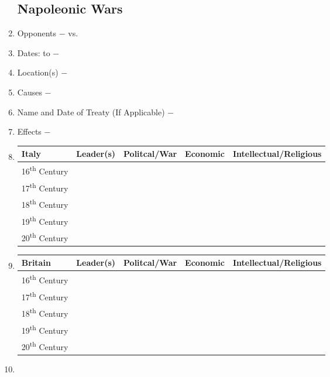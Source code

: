 \documentclass[12pt]{article}
\begin{document}
\begin{enumerate}
\subsection{Napoleonic Wars} 

\item Opponents $-$ vs.

\item Dates: to $-$

\item Location(s) $-$ 

\item Causes $-$

\item Name and Date of Treaty (If Applicable) $-$ 

\item Effects $-$ 

\item \begin{tabular}{l c c c c}

Italy & Leader(s) & Politcal/War & Economic & Intellectual/Religious \\
\hline
16\textsuperscript{th} Century & & & & \\
\hline
17\textsuperscript{th} Century & & & & \\
\hline
18\textsuperscript{th} Century & & & & \\
\hline
19\textsuperscript{th} Century & & & & \\
\hline
20\textsuperscript{th} Century & & & & \\

\end{tabular}

\item \begin{tabular}{l c c c c}

Britain & Leader(s) & Politcal/War & Economic & Intellectual/Religious \\
\hline
16\textsuperscript{th} Century & & & & \\
\hline
17\textsuperscript{th} Century & & & & \\
\hline
18\textsuperscript{th} Century & & & & \\
\hline
19\textsuperscript{th} Century & & & & \\
\hline
20\textsuperscript{th} Century & & & & \\

\end{tabular}

\item \begin{tabular}{l c c c c}


\end{tabular}
\end{enumerate}
\end{document}
